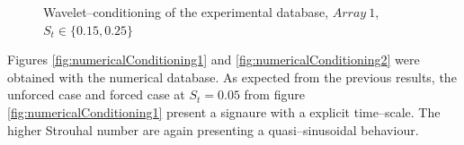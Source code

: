 \documentclass[english]{aiaa-tc}
\begin{document}
\begin{figure}[!ht]
\begin{center}
\begin{centering}
\end{centering}
\caption{Wavelet--conditioning of the experimental database, $Array~1$, $S_t \in \{0.15, 0.25\}$}
\label{fig:experimentalConditioning2}
\end{center}
\end{figure}

Figures \ref{fig:numericalConditioning1} and \ref{fig:numericalConditioning2} were obtained with the numerical database. As expected from the previous results, the unforced case and forced case at $S_t = 0.05$ from figure \ref{fig:numericalConditioning1} present a signaure with a explicit time--scale. The higher Strouhal number are again presenting a quasi--sinusoidal behaviour.
\end{document}
